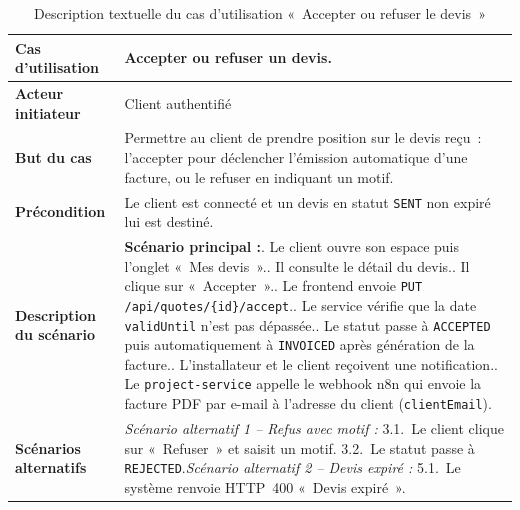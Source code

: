 \begin{table}[H]
  \caption{Description textuelle du cas d'utilisation «~Accepter ou refuser le devis~»}
  \label{tab:cu-accepter-devis}
  \centering
  \begin{tabularx}{\textwidth}{|L{3.8cm}|X|}
    \hline
    \textbf{Cas d'utilisation} & Accepter ou refuser un devis. \\
    \hline
    \textbf{Acteur initiateur} & Client authentifié \\
    \hline
    \textbf{But du cas} & Permettre au client de prendre position sur le devis reçu~: l'accepter pour déclencher l'émission automatique d'une facture, ou le refuser en indiquant un motif. \\
    \hline
    \textbf{Précondition} & Le client est connecté et un devis en statut \texttt{SENT} non expiré lui est destiné. \\
    \hline
    \textbf{Description du scénario} &
    \textbf{Scénario principal :}. Le client ouvre son espace puis l'onglet «~Mes devis~».. Il consulte le détail du devis.. Il clique sur «~Accepter~».. Le frontend envoie \texttt{PUT /api/quotes/\{id\}/accept}.. Le service vérifie que la date \texttt{validUntil} n'est pas dépassée.. Le statut passe à \texttt{ACCEPTED} puis automatiquement à \texttt{INVOICED} après génération de la facture.. L'installateur et le client reçoivent une notification.. Le \texttt{project-service} appelle le webhook n8n qui envoie la facture PDF par e-mail à l'adresse du client (\texttt{clientEmail}).\\
    \hline
    \textbf{Scénarios alternatifs} &
    \textit{Scénario alternatif 1 -- Refus avec motif :}\newline
    \hspace*{6pt}3.1.~Le client clique sur «~Refuser~» et saisit un motif.\newline
    \hspace*{6pt}3.2.~Le statut passe à \texttt{REJECTED}.\newline[2pt]
    \textit{Scénario alternatif 2 -- Devis expiré :}\newline
    \hspace*{6pt}5.1.~Le système renvoie HTTP~400 «~Devis expiré~».\\
    \hline
  \end{tabularx}
\end{table}

